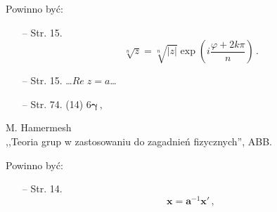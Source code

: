 \documentclass[a4paper,11pt]{article}
\begin{document}
Powinno być:
\begin{itemize}
\item[--] Str. 15.
  $$\sqrt[ n ]{ z } = \sqrt[ n ]{ | z | } \exp( i \frac{ \varphi + 2 k
    \pi }{ n } ) \, .$$
\item[--] Str. 15. \ldots $Re \; z = a$\ldots
\item[--] Str. 74. (14) $6 \boldsymbol{ \gamma } \, ,$
\end{itemize}



\begin{center}
  M. Hamermesh\\
  ,,Teoria grup w zastosowaniu do zagadnień fizycznych'', ABB.
\end{center}


Powinno być:
\begin{itemize}
\item[--] Str. 14. $$ \mathbf{ x } = \mathbf{ a }^{ -1 } \mathbf{ x }'
  \, ,$$
\end{itemize}





 {}



\end{document}
